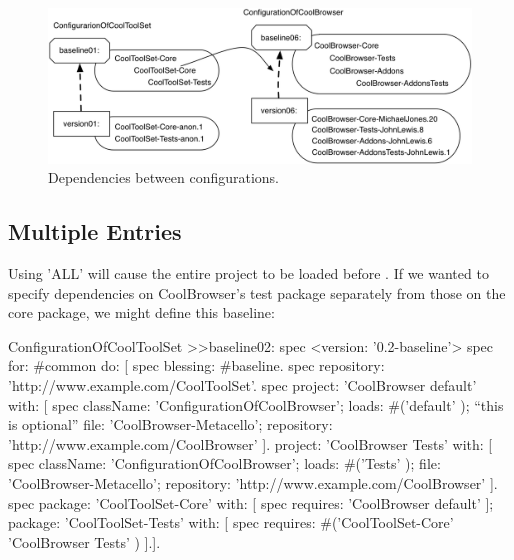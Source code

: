 \documentclass[a4paper,10pt,twoside]{book}
\begin{document}
                

\begin{figure}
\begin{center}
\includegraphics[width=0.9\linewidth]{version07}
\caption{Dependencies between configurations.\label{fig:version07}}
\end{center}
\end{figure} 



\subsection{Multiple Entries}

Using 'ALL' will cause the entire  project to be loaded before . 
If we wanted to specify dependencies on CoolBrowser's test package separately from those on the core package, we might define this baseline:

\begin{code}{}
ConfigurationOfCoolToolSet >>baseline02: spec 
       <version: '0.2-baseline'>
       spec for: #common do: [
              spec blessing: #baseline.
              spec repository: 'http://www.example.com/CoolToolSet'.
              spec project: 'CoolBrowser default' with: [
                            spec
                                   className: 'ConfigurationOfCoolBrowser';
                                   loads: #('default' );  ``this is optional''
                                   file: 'CoolBrowser-Metacello';
                                   repository: 'http://www.example.com/CoolBrowser' ].
                     project: 'CoolBrowser Tests' with: [
                            spec
                                   className: 'ConfigurationOfCoolBrowser';
                                   loads: #('Tests' );
                                   file: 'CoolBrowser-Metacello';
                                   repository: 'http://www.example.com/CoolBrowser' ].
              spec 
                     package: 'CoolToolSet-Core' with: [ spec requires: 'CoolBrowser default' ];
                     package: 'CoolToolSet-Tests' with: [ 
                            spec requires: #('CoolToolSet-Core'  'CoolBrowser Tests'  ) ].].                     
\end{code}
\end{document}
